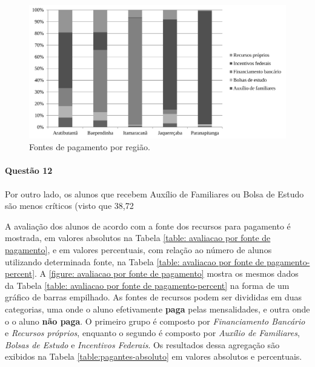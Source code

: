 \documentclass[10pt,a4paper,oneside]{article}
\begin{document}
\begin{figure}
\centering
	\includegraphics[width=0.80\linewidth]{plots/q11}
	\caption{Fontes de pagamento por região.}
	\label{figure: fonte de pagemento}
\end{figure}

\FloatBarrier
\paragraph{Questão 12}

Por outro lado, os alunos que recebem Auxílio de Familiares ou Bolsa de Estudo são menos críticos (visto que 38,72%

A avaliação dos alunos de acordo com a fonte dos recursos para pagamento é mostrada, em valores absolutos na Tabela \ref{table: avaliacao por fonte de pagamento}, e em valores percentuais, com relação ao número de alunos utilizando determinada fonte, na Tabela \ref{table: avaliacao por fonte de pagamento-percent}. A \ref{figure: avaliacao por fonte de pagamento} mostra os mesmos dados da Tabela \ref{table: avaliacao por fonte de pagamento-percent} na forma de um gráfico de barras empilhado. As fontes de recursos podem ser divididas em duas categorias, uma onde o aluno efetivamente \textbf{paga} pelas mensalidades, e outra onde o o aluno \textbf{não paga}. O primeiro grupo é composto por \textit{Financiamento Bancário} e \textit{Recursos próprios}, enquanto o segundo é composto por \textit{Auxílio de Familiares}, \textit{Bolsas de Estudo} e \textit{Incentivos Federais}. Os resultados dessa agregação são exibidos na Tabela \ref{table:pagantes-absoluto} em valores absolutos e percentuais.
\end{document}
